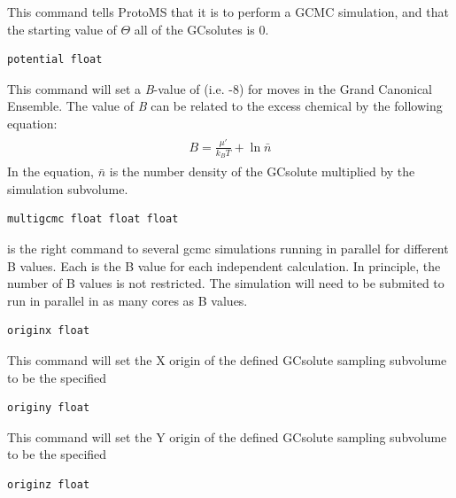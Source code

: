 \documentclass[letterpaper,10pt,english]{sphinxmanual}
\begin{document}
This command tells ProtoMS that it is to perform a GCMC simulation, and that the starting value of \(\Theta\) all of the GCsolutes is 0.

\begin{Verbatim}[frame=single,commandchars=\\\{\}]
potential float
\end{Verbatim}

This command will set a \emph{B}-value of  (i.e. -8) for moves in the Grand Canonical Ensemble. The value of \emph{B} can be related to the excess chemical by the following equation:
\label{protoms:equation-bval}\begin{gather}
\begin{split}B = \frac{\mu'}{k_{B}T}+\ln \bar{n}\end{split}\label{protoms-bval}
\end{gather}
In the equation, \(\bar{n}\) is the number density of the GCsolute multiplied by the simulation subvolume.

\begin{Verbatim}[frame=single,commandchars=\\\{\}]
multigcmc float float float
\end{Verbatim}

is the right command to several gcmc simulations running in parallel for different B values. Each  is the B value for each independent calculation. In principle, the number of B values is not restricted. The simulation will need to be submited to run in parallel in as many cores as B values.

\begin{Verbatim}[frame=single,commandchars=\\\{\}]
originx float
\end{Verbatim}

This command will set the X origin of the defined GCsolute sampling subvolume to be the specified 

\begin{Verbatim}[frame=single,commandchars=\\\{\}]
originy float
\end{Verbatim}

This command will set the Y origin of the defined GCsolute sampling subvolume to be the specified 

\begin{Verbatim}[frame=single,commandchars=\\\{\}]
originz float
\end{Verbatim}
\end{document}
